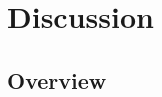 \documentclass[a4paper,11pt,UKenglish,twoside,openright]{report}\usepackage[]{graphicx}\usepackage[]{color}
\begin{document}










\chapter{Discussion}
\label{chp:5}


\section{Overview}
\end{document}
